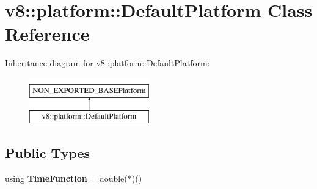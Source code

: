 \hypertarget{classv8_1_1platform_1_1DefaultPlatform}{}\section{v8\+:\+:platform\+:\+:Default\+Platform Class Reference}
\label{classv8_1_1platform_1_1DefaultPlatform}
Inheritance diagram for v8\+:\+:platform\+:\+:Default\+Platform\+:\begin{figure}[H]
\begin{center}
\leavevmode
\includegraphics[height=2.000000cm]{classv8_1_1platform_1_1DefaultPlatform}
\end{center}
\end{figure}
\subsection*{Public Types}
\begin{DoxyCompactItemize}
\item 
\mbox{\label{classv8_1_1platform_1_1DefaultPlatform_aa0e1584be0968a748319f759a91189f6}} 
using {\bfseries Time\+Function} = double($\ast$)()
\end{DoxyCompactItemize}
